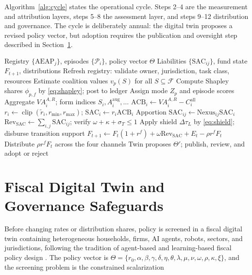 \documentclass[journal]{IEEEtran}
\theoremstyle{plain}
\theoremstyle{definition}
\newcommand{\ACB}{\mathrm{ACB}}
\newcommand{\SAC}{\mathrm{SAC}}
\newcommand{\AEAP}{\mathrm{AEAP}}
\newcommand{\Rev}{\mathrm{Rev}}
\newcommand{\clip}{\operatorname{clip}}
\begin{document}
Algorithm~\ref{alg:cycle} states the operational cycle. Steps 2--4 are the measurement and attribution layers, steps 5--8 the assessment layer, and steps 9--12 distribution and governance. The cycle is deliberately annual: the digital twin proposes a revised policy vector, but adoption requires the publication and oversight step described in Section~\ref{sec:twin}.

\begin{algorithm}[!t]
\caption{CivicDividendOS annual fiscal cycle}
\label{alg:cycle}
\begin{algorithmic}[1]
\Require Registry $\{\AEAP_j\}$, episodes $\{\mathcal{P}_i\}$, policy vector $\Theta$
\Ensure Liabilities $\{\SAC_{ij}\}$, fund state $F_{t+1}$, distributions
\State Refresh registry: validate owner, jurisdiction, task class, resources
  \State Estimate coalition values $v_p(S)$ for all $S\subseteq\mathcal{F}$
  \State Compute Shapley shares $\phi_{p,f}$ by \eqref{eq:shapley}; post to ledger
  \State Assign mode $Z_p$ and episode scores
\EndFor
{}
  \State Aggregate $VA^{A,R}_i$; form indices $S_i, A^{\mathrm{aug}}_i, \dots$
  \State $\ACB_i \gets VA^{A,R}_i - C^{\mathrm{all}}_i$ 
  \State $r_i \gets \clip(\tilde r_i, r_{\min}, r_{\max})$; $\SAC_i \gets r_i \ACB_i$
  \State Apportion $\SAC_{ij} \gets \mathrm{Nexus}_{ij}\SAC_i$ 
\EndFor
\State $\Rev_{\SAC} \gets \sum_{i,j}\SAC_{ij}$; verify $\omega + \kappa + \sigma_T \le 1$
\State Apply shield $\Delta\tau_L$ by \eqref{eq:shield}; disburse transition support
\State $F_{t+1} \gets F_t(1+r^{f}) + \omega\Rev_{\SAC} + E_t - \rho r^{f}F_t$
\State Distribute $\rho r^{f} F_t$ across the four channels
\State Twin proposes $\Theta'$; publish, review, and adopt or reject
\end{algorithmic}
\end{algorithm}

\section{Fiscal Digital Twin and Governance Safeguards}
\label{sec:twin}

Before changing rates or distribution shares, policy is screened in a fiscal digital twin containing heterogeneous households, firms, AI agents, robots, sectors, and jurisdictions, following the tradition of agent-based and learning-based fiscal policy design \cite{TaxAgent2025,Zheng2022AIEconomist}. The policy vector is $\Theta = \{r_0,\alpha,\beta,\gamma,\delta,\eta,\theta,\lambda,\mu,\nu,\omega,\rho,\kappa,\xi\}$, and the screening problem is the constrained scalarization
\end{document}
